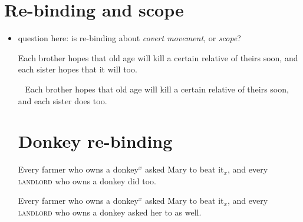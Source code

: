 \documentclass[nofonts,nobib]{tufte-handout}
\begin{document}
\section{Re-binding and scope}

\begin{itemize}
    
  \item question here: is re-binding about \emph{covert movement}, or \emph{scope}?
    
\ex
Each brother hopes that old age will kill a certain relative of theirs soon, and each sister hopes that it will too.
\xe
    
\ex~
Each brother hopes that old age will kill a certain relative of theirs soon, and each sister does too.
\xe
    
\section{Donkey re-binding}

\ex
Every farmer who owns a donkey\(^{x}\) asked Mary to beat it\(_{x}\),\newline
and every \textsc{landlord} who owns a donkey did too. 
\xe
    
\ex
Every farmer who owns a donkey\(^{x}\) asked Mary to beat it\(_{x}\),\newline
and every \textsc{landlord} who owns a donkey asked her to as well. 
\xe
    

    
\end{itemize}

\newpage

\begin{fullwidth}
\printbibliography
\end{fullwidth}
\end{document}
